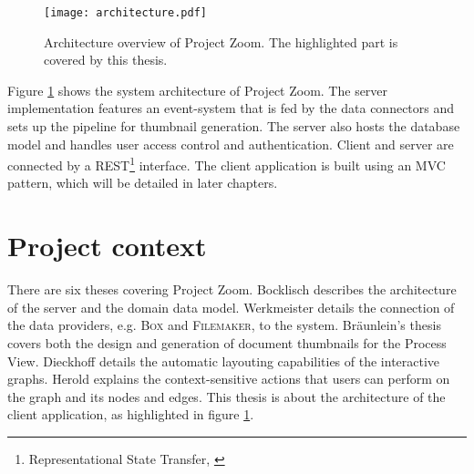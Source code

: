 \begin{figure}
\begin{center}
\texttt{[image: architecture.pdf]}
\caption{Architecture overview of Project Zoom. The highlighted part is covered by this thesis.}
\label{fig:CompleteArchitectureDiagram}
\end{center}
\end{figure}

Figure \ref{fig:CompleteArchitectureDiagram} shows the system architecture of Project Zoom. The server implementation features an event-system that is fed by the data connectors and sets up the pipeline for thumbnail generation. The server also hosts the database model and handles user access control and authentication. Client and server are connected by a REST\footnote{Representational State Transfer, \cite{Fielding_2000}} interface. The client application is built using an MVC pattern, which will be detailed in later chapters. 

\section{Project context}
There are six theses covering Project Zoom. Bocklisch \cite{Bocklisch_2013} describes the architecture of the server and the domain data model. Werkmeister \cite{Werkmeister_2013} details the connection of the data pro\-vi\-ders, e.g. \textsc{Box} and \textsc{Filemaker}, to the system. Bräunlein's thesis \cite{Braeunlein_2013} covers both the design and generation of document thumbnails for the Process View. Dieckhoff \cite{Dieckhoff_2013} details the automatic layouting capabilities of the interactive graphs. Herold \cite{Herold_2013} explains the context-sensitive actions that users can perform on the graph and its nodes and edges. This thesis is about the architecture of the client application, as highlighted in figure \ref{fig:CompleteArchitectureDiagram}.

